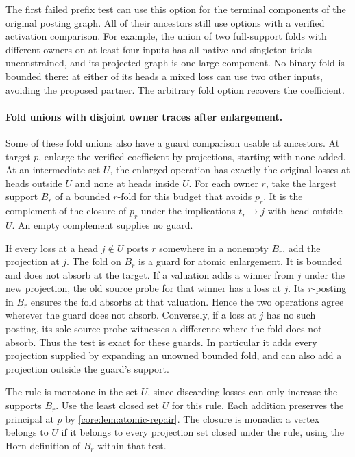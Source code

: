 The first failed prefix test can use this option for
the terminal components of the original posting graph.
All of their ancestors still use options with a verified
activation comparison. For example, the union of two
full-support folds with different owners on at least
four inputs has all native and singleton trials
unconstrained, and its projected graph is one large
component. No binary fold is bounded there: at either
of its heads a mixed loss can use two other inputs,
avoiding the proposed partner. The arbitrary fold
option recovers the coefficient.

\paragraph{Fold unions with disjoint owner traces after enlargement.}
Some of these fold unions also have a guard comparison usable
at ancestors. At target $p$, enlarge the verified coefficient
by projections, starting with none added. At an intermediate
set $U$, the enlarged operation has exactly the original
losses at heads outside $U$ and none at heads inside $U$.
For each owner $r$, take the largest support $B_r$ of a
bounded $r$-fold for this budget that avoids $p_r$. It is the
complement of the closure of $p_r$ under the implications
$t_r\to j$ with head outside $U$. An empty complement
supplies no guard.

If every loss at a head $j\notin U$ posts $r$ somewhere in
a nonempty $B_r$, add the projection at $j$. The fold on
$B_r$ is a guard for atomic enlargement. It is bounded and
does not absorb at the target. If a valuation adds a winner
from $j$ under the new projection, the old source probe
for that winner has a loss at $j$. Its $r$-posting in $B_r$
ensures the fold absorbs at that valuation. Hence the two
operations agree wherever the guard does not absorb.
Conversely, if a loss at $j$ has no such posting, its
sole-source probe witnesses a difference where the fold
does not absorb. Thus the test is exact for these guards.
In particular it adds every projection supplied by
expanding an unowned bounded fold, and can also add a
projection outside the guard's support.

The rule is monotone in the set $U$, since discarding
losses can only increase the supports $B_r$. Use the
least closed set $U$ for this rule. Each addition preserves
the principal at $p$ by \cref{core:lem:atomic-repair}.
The closure is monadic: a vertex belongs to $U$ if it
belongs to every projection set closed under the rule,
using the Horn definition of $B_r$ within that test.

